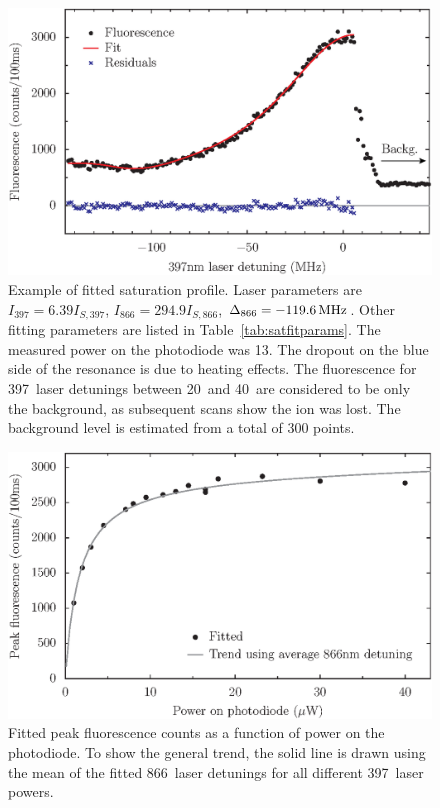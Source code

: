 \begin{figure}[h!t]
\centering
\includegraphics{chapter7/saturation/397satfit_v5}
\caption[Saturation scan fit example]{Example of fitted saturation profile. Laser parameters are $I_{397} = 6.39 I_{S,397}$, $I_{866} = 294.9 I_{S,866}$, $\Delta_{866} = -119.6\,\mbox{MHz}$. Other fitting parameters are listed in Table~\ref{tab:satfitparams}. The measured power on the photodiode was 13\uW. The dropout on the blue side of the resonance is due to heating effects. The fluorescence  for 397\nm\, laser detunings between 20\MHz\, and 40\MHz\, are considered to be only the background, as subsequent scans show the ion was lost. The background level is estimated from a total of 300 points.}
\label{fig:satexamplefit}
\end{figure} 

\begin{figure}[h!t]
\centering
\includegraphics{chapter7/saturation/397sat_v3}
\caption[397\nm\, laser saturation curve]{Fitted peak fluorescence counts as a function of power on the photodiode. To show the general trend, the solid line is drawn using the mean of the fitted 866\nm\, laser detunings for all different 397\nm\, laser powers.}
\label{fig:397saturation}
\end{figure} 

